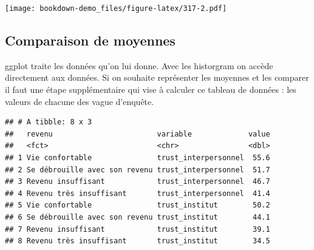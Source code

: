 \documentclass[
]{book}
\newenvironment{Shaded}{\begin{snugshade}}{\end{snugshade}}
\newcommand{\DataTypeTok}[1]{\textcolor[rgb]{0.13,0.29,0.53}{#1}}
\newcommand{\KeywordTok}[1]{\textcolor[rgb]{0.13,0.29,0.53}{\textbf{#1}}}
\newcommand{\NormalTok}[1]{#1}
\newcommand{\OperatorTok}[1]{\textcolor[rgb]{0.81,0.36,0.00}{\textbf{#1}}}
\newcommand{\OtherTok}[1]{\textcolor[rgb]{0.56,0.35,0.01}{#1}}
\newcommand{\StringTok}[1]{\textcolor[rgb]{0.31,0.60,0.02}{#1}}
\begin{document}
\texttt{[image: bookdown-demo\_files/figure-latex/317-2.pdf]}

\hypertarget{comparaison-de-moyennes}{%
\subsection{Comparaison de moyennes}\label{comparaison-de-moyennes}}

ggplot traite les données qu'on lui donne. Avec les historgram on accède directement aux données. Si on souhaite représenter les moyennes et les comparer il faut une étape supplémentaire qui vise à calculer ce tableau de données : les valeurs de chacune des vague d'enquête.

\begin{Shaded}
\end{Shaded}

\begin{verbatim}
## # A tibble: 8 x 3
##   revenu                        variable             value
##   <fct>                         <chr>                <dbl>
## 1 Vie confortable               trust_interpersonnel  55.6
## 2 Se débrouille avec son revenu trust_interpersonnel  51.7
## 3 Revenu insuffisant            trust_interpersonnel  46.7
## 4 Revenu très insuffisant       trust_interpersonnel  41.4
## 5 Vie confortable               trust_institut        50.2
## 6 Se débrouille avec son revenu trust_institut        44.1
## 7 Revenu insuffisant            trust_institut        39.1
## 8 Revenu très insuffisant       trust_institut        34.5
\end{verbatim}
\end{document}

